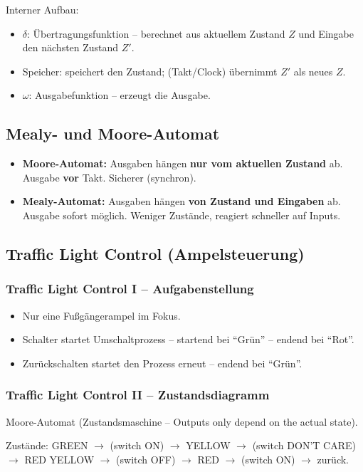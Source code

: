 \documentclass[11pt,a4paper]{article}
\begin{document}
Interner Aufbau:
\begin{itemize}
    \item $\delta$: Übertragungsfunktion -- berechnet aus aktuellem Zustand $Z$ und Eingabe den nächsten Zustand $Z'$.
    \item Speicher: speichert den Zustand; (Takt/Clock) übernimmt $Z'$ als neues $Z$.
    \item $\omega$: Ausgabefunktion -- erzeugt die Ausgabe.
\end{itemize}

\subsection{Mealy- und Moore-Automat}
\begin{itemize}
    \item \textbf{Moore-Automat:} Ausgaben hängen \textbf{nur vom aktuellen Zustand} ab. Ausgabe \textbf{vor} Takt. Sicherer (synchron).
    \item \textbf{Mealy-Automat:} Ausgaben hängen \textbf{von Zustand und Eingaben} ab. Ausgabe sofort möglich. Weniger Zustände, reagiert schneller auf Inputs.
\end{itemize}

\subsection{Traffic Light Control (Ampelsteuerung)}

\subsubsection{Traffic Light Control I -- Aufgabenstellung}
\begin{itemize}
    \item Nur eine Fußgängerampel im Fokus.
    \item Schalter startet Umschaltprozess -- startend bei ``Grün'' -- endend bei ``Rot''.
    \item Zurückschalten startet den Prozess erneut -- endend bei ``Grün''.
\end{itemize}

\subsubsection{Traffic Light Control II -- Zustandsdiagramm}
Moore-Automat (Zustandsmaschine -- Outputs only depend on the actual state).

Zustände: GREEN $\to$ (switch ON) $\to$ YELLOW $\to$ (switch DON'T CARE) $\to$ RED YELLOW $\to$ (switch OFF) $\to$ RED $\to$ (switch ON) $\to$ zurück.
\end{document}
